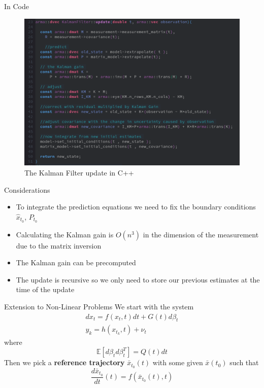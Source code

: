 \documentclass{beamer}
\begin{document}
\begin{frame}{In Code}

  \begin{figure}
    \includegraphics[scale=0.3]{kalman_implementation.png}
    \caption{The Kalman Filter update in C++}
  \end{figure}
\end{frame}

\begin{frame}{Considerations}
  \begin{itemize}
   \pause
\item To integrate the prediction equations we need to fix the boundary
  conditions $\hat{x}_{t_0}$, $P_{t_0}$
   \pause
  \item Calculating the Kalman gain is $O(n^3)$ in the dimension of the
    measurement due to the matrix inversion
    \pause
  \item The Kalman gain can be precomputed
    \pause 
\item The update is recursive so we only need to store our previous estimates at
  the time of the update
 
  \end{itemize}

\end{frame}
 
\begin{frame}{Extension to Non-Linear Problems}
  We start with the system
  \begin{align}
    dx_t = f(x_t,t)dt + G(t)d\beta_t \\
    y_k = h(x_{t_k}, t) + \nu_t
  \end{align}
  where
  \begin{equation}
    \mathbb{E}[d\beta_td\beta^T_t] = Q(t) dt
  \end{equation}
  \pause
  Then we pick a \textbf{reference trajectory} $\bar{x}_{t_0}(t)$ with some given
  $\bar{x}(t_0)$ such that
  \begin{equation}
    \frac{d\bar{x}_{t_0}}{dt}(t) = f(\bar{x}_{t_0}(t),t)
  \end{equation}
\end{frame}
\end{document}
